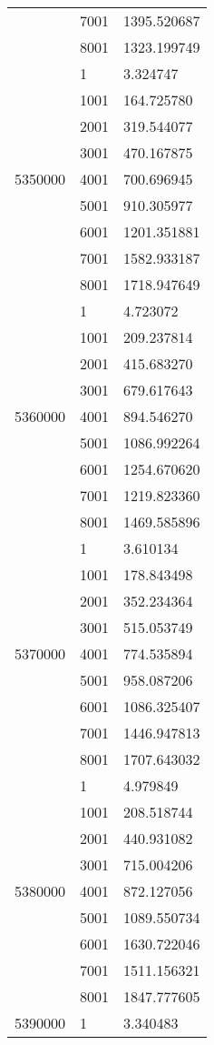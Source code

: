\begin{table}[htb!]
\begin{tabular}{lll}
 & 7001 & 1395.520687 \\
 & 8001 & 1323.199749 \\
\multirow[c]{9}{*}{5350000} & 1 & 3.324747 \\
 & 1001 & 164.725780 \\
 & 2001 & 319.544077 \\
 & 3001 & 470.167875 \\
 & 4001 & 700.696945 \\
 & 5001 & 910.305977 \\
 & 6001 & 1201.351881 \\
 & 7001 & 1582.933187 \\
 & 8001 & 1718.947649 \\
\multirow[c]{9}{*}{5360000} & 1 & 4.723072 \\
 & 1001 & 209.237814 \\
 & 2001 & 415.683270 \\
 & 3001 & 679.617643 \\
 & 4001 & 894.546270 \\
 & 5001 & 1086.992264 \\
 & 6001 & 1254.670620 \\
 & 7001 & 1219.823360 \\
 & 8001 & 1469.585896 \\
\multirow[c]{9}{*}{5370000} & 1 & 3.610134 \\
 & 1001 & 178.843498 \\
 & 2001 & 352.234364 \\
 & 3001 & 515.053749 \\
 & 4001 & 774.535894 \\
 & 5001 & 958.087206 \\
 & 6001 & 1086.325407 \\
 & 7001 & 1446.947813 \\
 & 8001 & 1707.643032 \\
\multirow[c]{9}{*}{5380000} & 1 & 4.979849 \\
 & 1001 & 208.518744 \\
 & 2001 & 440.931082 \\
 & 3001 & 715.004206 \\
 & 4001 & 872.127056 \\
 & 5001 & 1089.550734 \\
 & 6001 & 1630.722046 \\
 & 7001 & 1511.156321 \\
 & 8001 & 1847.777605 \\
\multirow[c]{9}{*}{5390000} & 1 & 3.340483 \\

\end{tabular}
\end{table}
